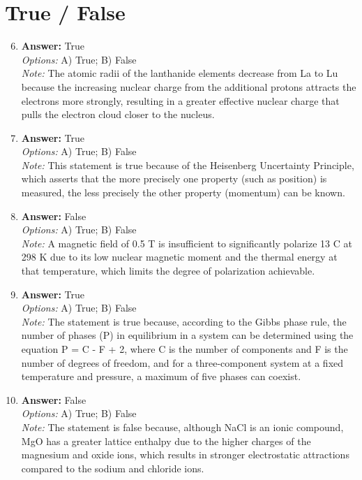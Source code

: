 \documentclass[12pt]{article}
\begin{document}
\section*{True / False}
\begin{enumerate}[label=\arabic*.]
\setcounter{enumi}{5}
\item \textbf{Answer:} True
\\ \textit{Options:} A) True; B) False
\\ \textit{Note:} The atomic radii of the lanthanide elements decrease from La to Lu because the increasing nuclear charge from the additional protons attracts the electrons more strongly, resulting in a greater effective nuclear charge that pulls the electron cloud closer to the nucleus.
\item \textbf{Answer:} True
\\ \textit{Options:} A) True; B) False
\\ \textit{Note:} This statement is true because of the Heisenberg Uncertainty Principle, which asserts that the more precisely one property (such as position) is measured, the less precisely the other property (momentum) can be known.
\item \textbf{Answer:} False
\\ \textit{Options:} A) True; B) False
\\ \textit{Note:} A magnetic field of 0.5 T is insufficient to significantly polarize 13 C at 298 K due to its low nuclear magnetic moment and the thermal energy at that temperature, which limits the degree of polarization achievable.
\item \textbf{Answer:} True
\\ \textit{Options:} A) True; B) False
\\ \textit{Note:} The statement is true because, according to the Gibbs phase rule, the number of phases (P) in equilibrium in a system can be determined using the equation P = C - F + 2, where C is the number of components and F is the number of degrees of freedom, and for a three-component system at a fixed temperature and pressure, a maximum of five phases can coexist.
\item \textbf{Answer:} False
\\ \textit{Options:} A) True; B) False
\\ \textit{Note:} The statement is false because, although NaCl is an ionic compound, MgO has a greater lattice enthalpy due to the higher charges of the magnesium and oxide ions, which results in stronger electrostatic attractions compared to the sodium and chloride ions.
\end{enumerate}
\end{document}
